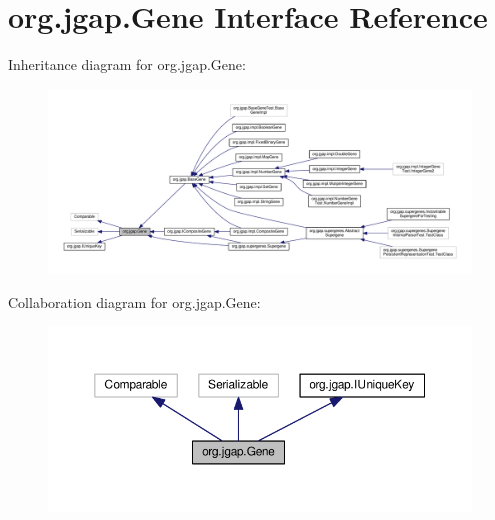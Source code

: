 \hypertarget{interfaceorg_1_1jgap_1_1_gene}{\section{org.\-jgap.\-Gene Interface Reference}
\label{interfaceorg_1_1jgap_1_1_gene}
}


Inheritance diagram for org.\-jgap.\-Gene\-:
\nopagebreak
\begin{figure}[H]
\begin{center}
\leavevmode
\includegraphics[width=350pt]{interfaceorg_1_1jgap_1_1_gene__inherit__graph}
\end{center}
\end{figure}


Collaboration diagram for org.\-jgap.\-Gene\-:
\nopagebreak
\begin{figure}[H]
\begin{center}
\leavevmode
\includegraphics[width=350pt]{interfaceorg_1_1jgap_1_1_gene__coll__graph}
\end{center}
\end{figure}
